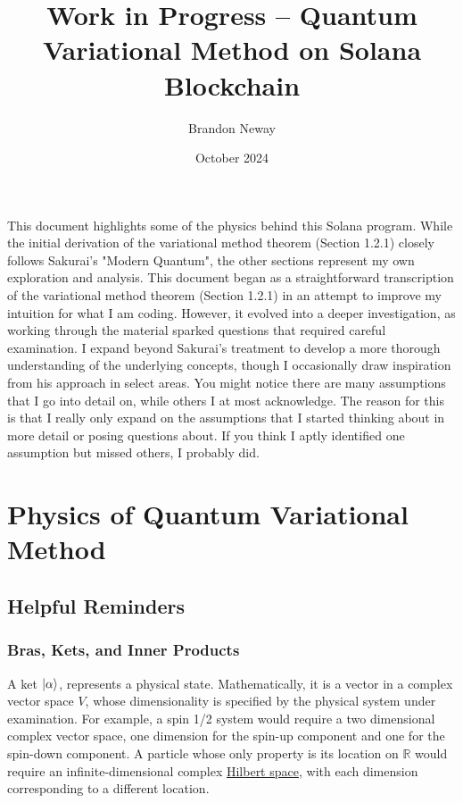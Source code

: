 \documentclass[12pt]{article}
\title{\textbf{Work in Progress -- Quantum Variational Method on Solana Blockchain}}
\author{Brandon Neway}
\date{October 2024}
\numberwithin{equation}{section}
\begin{document}
\maketitle

\hspace{1cm} This document highlights some of the physics behind this Solana program. While the initial derivation of the variational method theorem (Section 1.2.1) closely follows Sakurai's "Modern Quantum", the other sections represent my own exploration and analysis. This document began as a straightforward transcription of the variational method theorem (Section 1.2.1) in an attempt to improve my intuition for what I am coding. However, it evolved into a deeper investigation, as working through the material sparked questions that required careful examination. I expand beyond Sakurai's treatment to develop a more thorough understanding of the underlying concepts, though I occasionally draw inspiration from his approach in select areas. You might notice there are many assumptions that I go into detail on, while others I at most acknowledge. The reason for this is that I really only expand on the assumptions that I started thinking about in more detail or posing questions about. If you think I aptly identified one assumption but missed others, I probably did.

\section{Physics of Quantum Variational Method}
\subsection{Helpful Reminders}
\subsubsection{Bras, Kets, and Inner Products}
\hspace{1cm} A ket $\ket{\alpha}$, represents a physical state. Mathematically, it is a vector in a complex vector space $V$, whose dimensionality is specified by the physical system under examination. For example, a spin 1/2 system would require a two dimensional complex vector space, one dimension for the spin-up component and one for the spin-down component. A particle whose only property is its location on $\mathbb{R}$ would require an infinite-dimensional complex \href{https://en.wikipedia.org/wiki/Hilbert_space#Definition}{Hilbert space}, with each dimension corresponding to a different location.
\end{document}

